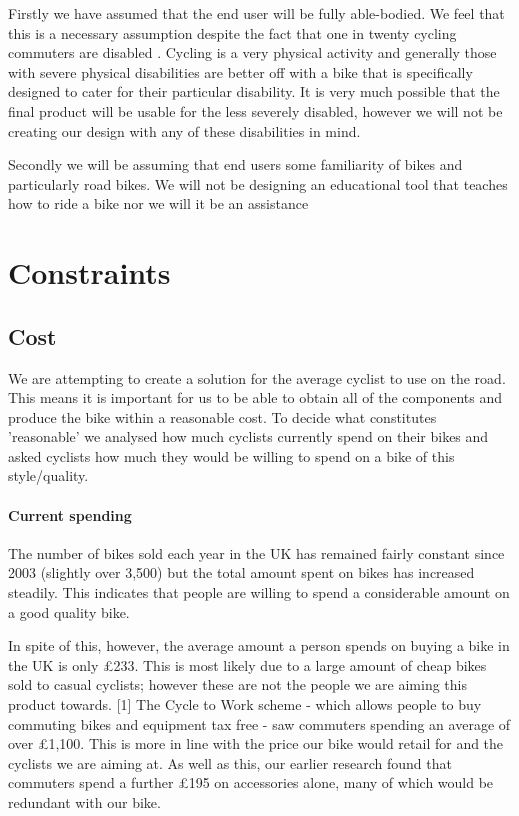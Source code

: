 \documentclass[]{report}
\begin{document}
Firstly we have assumed that the end user will be fully able-bodied. We feel that this is a necessary assumption despite the fact that one in twenty cycling commuters are disabled \citep{wheelsforwell}. Cycling is a very physical activity and generally those with severe physical disabilities are better off with a bike that is specifically designed to cater for their particular disability. It is very much possible that the final product will be usable for the less severely disabled, however we will not be creating our design with any of these disabilities in mind.

Secondly we will be assuming that end users some familiarity of bikes and particularly road bikes. We will not be designing an educational tool that teaches how to ride a bike nor we will it be an assistance 

\section{Constraints}
\subsection{Cost}
We are attempting to create a solution for the average cyclist to use on the road. This means it is important for us to be able to obtain all of the components and produce the bike within a reasonable cost. To decide what constitutes 'reasonable' we analysed how much cyclists currently spend on their bikes and asked cyclists how much they would be willing to spend on a bike of this style/quality.
\paragraph{Current spending}
The number of bikes sold each year in the UK has remained fairly constant since 2003 (slightly over 3,500) but the total amount spent on bikes has increased steadily. This indicates that people are willing to spend a considerable amount on a good quality bike.

In spite of this, however, the average amount a person spends on buying a bike in the UK is only £233. This is most likely due to a large amount of cheap bikes sold to casual cyclists; however these are not the people we are aiming this product towards. [1] The Cycle to Work scheme - which allows people to buy commuting bikes and equipment tax free - saw commuters spending an average of over £1,100. This is more in line with the price our bike would retail for and the cyclists we are aiming at. As well as this, our earlier research found that commuters spend a further £195 on accessories alone, many of which would be redundant with our bike.
\end{document}
